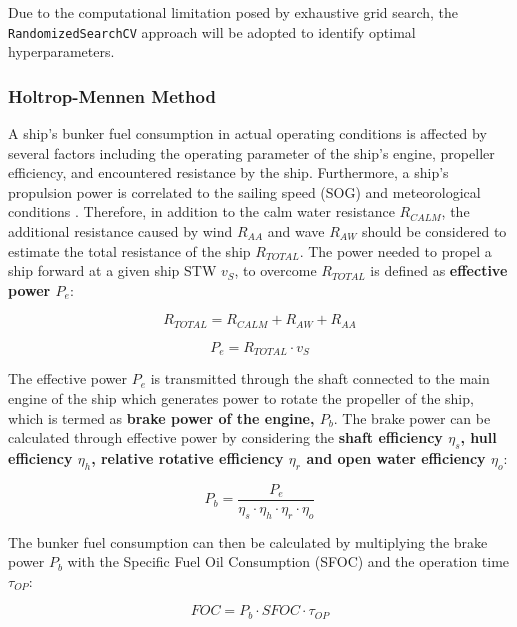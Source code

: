 \documentclass[]{interact}
\theoremstyle{plain}%
\theoremstyle{definition}
\theoremstyle{remark}
\begin{document}
Due to the computational limitation posed by exhaustive grid search, the {\tt RandomizedSearchCV} approach will be adopted to identify optimal hyperparameters. 

\subsubsection{Holtrop-Mennen Method}\label{sec:Holtrop_mennen_j}

A ship's bunker fuel consumption in actual operating conditions is affected by several factors including the operating parameter of the ship's engine, propeller efficiency, and encountered resistance by the ship. Furthermore, a ship's propulsion power is correlated to the sailing speed (SOG) and meteorological conditions \citep{XiaoLang.2020}. Therefore, in addition to the calm water resistance $R_{CALM}$, the additional resistance caused by wind $R_{AA}$ and wave $R_{AW}$ should be considered to estimate the total resistance of the ship $R_{TOTAL}$. The power needed to propel a ship forward at a given ship STW $v_S$, to overcome $R_{TOTAL}$ is defined as \textbf{effective power $P_e$}:

\begin{equation}\label{eqn:R_tot}
    R_{TOTAL} = R_{CALM} + R_{AW} + R_{AA} 
\end{equation}

\begin{equation}\label{eqn:P_e}
    P_e = R_{TOTAL}\cdot v_{S}
\end{equation}

The effective power $P_e$ is transmitted through the shaft connected to the main engine of the ship which generates power to rotate the propeller of the ship, which is termed as \textbf{brake power of the engine, $P_b$}. The brake power can be calculated through effective power by considering the \textbf{shaft efficiency $\eta_s$, hull efficiency $\eta_h$, relative rotative efficiency $\eta_r$ and open water efficiency $\eta_o$}:

\begin{equation}\label{eqn:P_b}
    P_b = \frac{P_e}{\eta_s\cdot\eta_h\cdot\eta_r\cdot\eta_o}
\end{equation}

The bunker fuel consumption can then be calculated by multiplying the brake power $P_b$ with the Specific Fuel Oil Consumption (SFOC) and the operation time $\tau_{OP}$:

\begin{equation}\label{eqn:FOC}
    FOC = P_b\cdot SFOC\cdot \tau_{OP} 
\end{equation}
\end{document}
